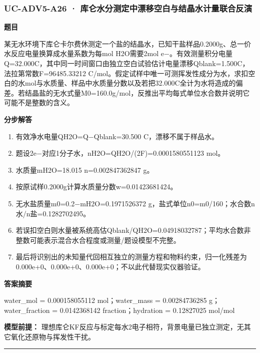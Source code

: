 \documentclass[UTF8,11pt,a4paper]{ctexart}
\begin{document}
\subsubsection*{UC-ADV5-A26 · 库仑水分测定中漂移空白与结晶水计量联合反演}
\noindent\textbf{题目}\par
某无水环境下库仑卡尔费休测定一个盐的结晶水，已知干盐样品0.2000g、总一价水反应电量换算成水量系数为每mol H2O需要2mol e−。有效测量积分电量Q=32.000C，其中同一时间窗口由独立空白试验估计电量漂移Qblank=1.500C，法拉第常数F=96485.33212 C/mol。假定试样中唯一可测挥发性成分为水，求扣空白的水mol与水质量、样品中水质量分数以及若把32.000C全计为水将造成的偏差。若结晶盐的无水式量M0=160.0g/mol，反推出平均每式单位水合数并说明它可能不是整数的含义。\par
\medskip\noindent\textbf{分步解答}
\begin{enumerate}
\item 有效净水电量QH2O=Q−Qblank=30.500 C，漂移不属于样品水。
\item 题设2e−对应1分子水，nH2O=QH2O/(2F)=0.0001580551123 mol。
\item 水质量mH2O=18.015 n=0.002847362847 g。
\item 按原试样0.2000g计算水质量分数w=0.01423681424。
\item 无水盐质量m0=0.2−mH2O=0.1971526372 g，盐式单位n0=m0/160；水合数n水/n盐=0.1282702495。
\item 若误扣空白则水量被系统高估Qblank/QH2O=0.04918032787；平均水合数非整数可能表示混合水合程度或测量/题设模型不完整。
\item 最后将识别出的未知量代回相互独立的测量方程和物料约束，归一化残差为 0.000e+0、0.000e+0、0.000e+0；不以此代替现实仪器验证。
\end{enumerate}
\noindent\textbf{答案摘要}\par
water\_mol = 0.000158055112 mol；water\_mass = 0.00284736285 g；water\_fraction = 0.0142368142 fraction；hydration = 0.12827025 mol/mol\par
\noindent\textbf{模型前提：}
理想库仑KF反应与标定每水2电子相符，背景电量已独立测定，无其它氧化还原物与挥发性干扰。\par
\medskip\hrule\medskip
{}
\end{document}
